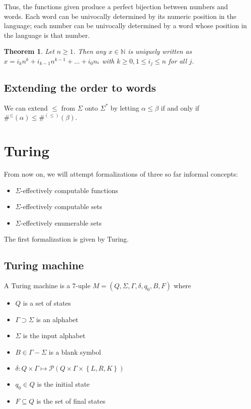 \documentclass[a4paper, 12pt]{article}
\newtheorem{theorem}{Theorem}
\newtheorem{theorem}{Theorem}
\begin{document}
Thus, the functions given produce a perfect bijection between numbers and words.
Each word can be univocally determined by its numeric position in the language;
each number can be univocally determined by a word whose position in the
language is that number. 

\begin{theorem}
    Let $n \geq 1$. Then any $x \in \mathbb{N}$ is uniquely written as $x = i_k
    n^k + i_{k-1} n^{k-1} + \ldots + i_0 n_^0$ with $k \geq 0, 1 \leq i_j \leq
    n$ for all $j$.
\end{theorem}

\subsection{Extending the order to words}

We can extend $\leq$ from $\Sigma$ onto $\Sigma^{*}$ by letting $\alpha \leq
\beta $ if and only if $\#^{\leq}(\alpha) \leq \#^{(\leq)}(\beta )$.

\pagebreak






\section{Turing}

From now on, we will attempt formalizations of three so far informal concepts: 

\begin{itemize}
    \item $\Sigma$-effectively computable functions
    \item $\Sigma$-effectively computable sets
    \item $\Sigma$-effectively enumerable sets
\end{itemize}

The first formalization is given by Turing.

\subsection{Turing machine}

A Turing machine is a $7$-uple $M = \left( Q, \Sigma, \Gamma, \delta, q_0, B, F
\right) $ where

\begin{itemize}
    \item $Q$ is a set of states 
    \item $\Gamma \supset \Sigma$ is an alphabet
    \item $\Sigma$ is the input alphabet
    \item $B \in \Gamma - \Sigma$ is a blank symbol 
    \item $\delta : Q \times \Gamma \mapsto \mathcal{P} \left( Q \times \Gamma \times \left\{
        L, R, K\right\}  \right) $ 
    \item $q_0 \in Q$ is the initial state 
    \item $F \subseteq Q$ is the set of final states
\end{itemize}
\end{document}
